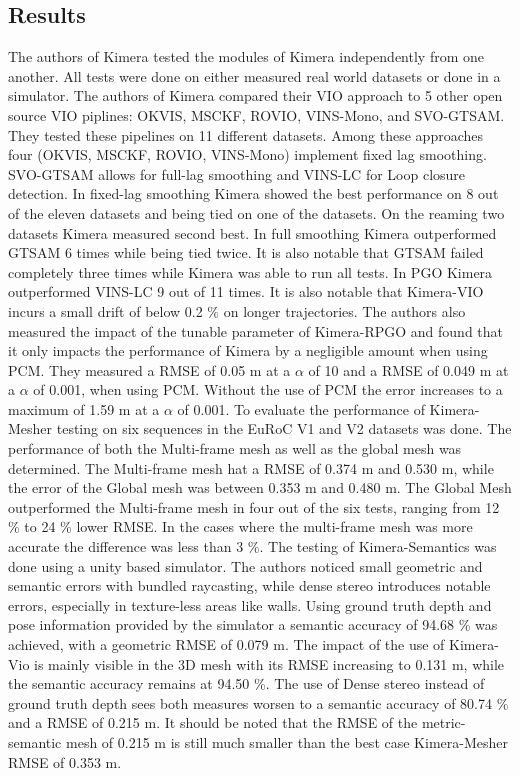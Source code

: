 \documentclass[11pt,a4paper]{article}
\begin{document}
\subsection{Results}
The authors of Kimera tested the modules of Kimera independently from one another. 
All tests were done on either measured real world datasets or done in a simulator.
The authors of Kimera compared their VIO approach to 5 other open source VIO piplines: OKVIS, MSCKF, ROVIO, VINS-Mono, and SVO-GTSAM.
They tested these pipelines on 11 different datasets.
Among these approaches four (OKVIS, MSCKF, ROVIO, VINS-Mono) implement fixed lag smoothing. 
SVO-GTSAM allows for full-lag smoothing and VINS-LC for Loop closure detection. 
In fixed-lag smoothing Kimera showed the best performance on 8 out of the eleven datasets and being tied on one of the datasets. 
On the reaming two datasets Kimera measured second best.
In full smoothing Kimera outperformed GTSAM 6 times while being tied twice. 
It is also notable that GTSAM failed completely three times while Kimera was able to run all tests.
In PGO Kimera outperformed VINS-LC 9 out of 11 times. 
It is also notable that Kimera-VIO incurs a small drift of below 0.2 $\%$ on longer trajectories. 
The authors also measured the impact of the tunable parameter of Kimera-RPGO and found that it only impacts the performance of Kimera by a negligible amount when using PCM.
They measured a RMSE of 0.05 m at a $\alpha$ of 10 and a RMSE of 0.049 m at a $\alpha$ of 0.001, when using PCM. 
Without the use of PCM the error increases to a maximum of 1.59 m at a $\alpha$ of 0.001. 
To evaluate the performance of Kimera-Mesher testing on six sequences in the EuRoC V1 and V2 datasets was done. 
The performance of both the Multi-frame mesh as well as the global mesh was determined. 
The Multi-frame mesh hat a RMSE of 0.374 m and 0.530 m, while the error of the Global mesh was between 0.353 m and 0.480 m.
The Global Mesh outperformed the Multi-frame mesh in four out of the six tests, ranging from 12 \% to 24 \% lower RMSE.
In the cases where the multi-frame mesh was more accurate the difference was less than 3 \%.
The testing of Kimera-Semantics was done using a unity based simulator. 
The authors noticed small geometric and semantic errors with bundled raycasting, while dense stereo introduces notable errors, especially in texture-less areas like walls. 
Using ground truth depth and pose information provided by the simulator a semantic accuracy of 94.68 \% was achieved, with a geometric RMSE of 0.079 m.
The impact of the use of Kimera-Vio is mainly visible in the 3D mesh with its RMSE increasing to 0.131 m, while the semantic accuracy remains at 94.50 \%. 
The use of Dense stereo instead of ground truth depth sees both measures worsen to a semantic accuracy of 80.74 \% and a RMSE of 0.215 m.
It should be noted that the RMSE of the metric-semantic mesh of 0.215 m is still much smaller than the best case Kimera-Mesher RMSE of 0.353 m.
\end{document}
